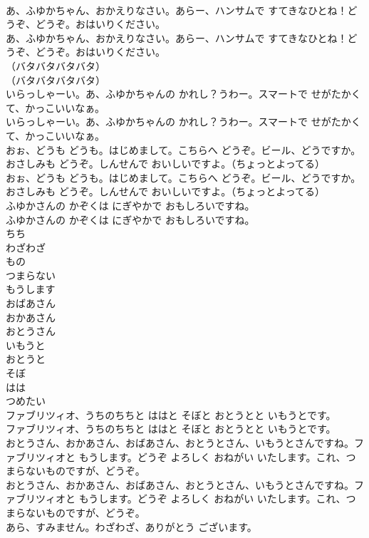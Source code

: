 \documentclass[8pt]{extreport}
\begin{document}
\begin{CJK}{UTF8}{min}
\\	あ、ふゆかちゃん、おかえりなさい。あらー、ハンサムで すてきなひとね！どうぞ、どうぞ。おはいりください。	
\\	あ、ふゆかちゃん、おかえりなさい。あらー、ハンサムで すてきなひとね！どうぞ、どうぞ。おはいりください。 
\\	（バタバタバタバタ）	
\\	（バタバタバタバタ） 
\\	いらっしゃーい。あ、ふゆかちゃんの かれし？うわー。スマートで せがたかくて、かっこいいなぁ。	
\\	いらっしゃーい。あ、ふゆかちゃんの かれし？うわー。スマートで せがたかくて、かっこいいなぁ。　 
\\	おぉ、どうも どうも。はじめまして。こちらへ どうぞ。ビール、どうですか。おさしみも どうぞ。しんせんで おいしいですよ。（ちょっとよってる）	
\\	おぉ、どうも どうも。はじめまして。こちらへ どうぞ。ビール、どうですか。おさしみも どうぞ。しんせんで おいしいですよ。（ちょっとよってる） 
\\	ふゆかさんの かぞくは にぎやかで おもしろいですね。	
\\	ふゆかさんの かぞくは にぎやかで おもしろいですね。 
\\	ちち
\\	わざわざ
\\	もの
\\	つまらない
\\	もうします
\\	おばあさん
\\	おかあさん
\\	おとうさん
\\	いもうと
\\	おとうと
\\	そぼ
\\	はは
\\	つめたい
\\	ファブリツィオ、うちのちちと ははと そぼと おとうとと いもうとです。	
\\	ファブリツィオ、うちのちちと ははと そぼと おとうとと いもうとです。 
\\	おとうさん、おかあさん、おばあさん、おとうとさん、いもうとさんですね。ファブリツィオと もうします。どうぞ よろしく おねがい いたします。これ、つまらないものですが、どうぞ。	
\\	おとうさん、おかあさん、おばあさん、おとうとさん、いもうとさんですね。ファブリツィオと もうします。どうぞ よろしく おねがい いたします。これ、つまらないものですが、どうぞ。 
\\	あら、すみません。わざわざ、ありがとう ございます。	

\end{CJK}
\end{document}
